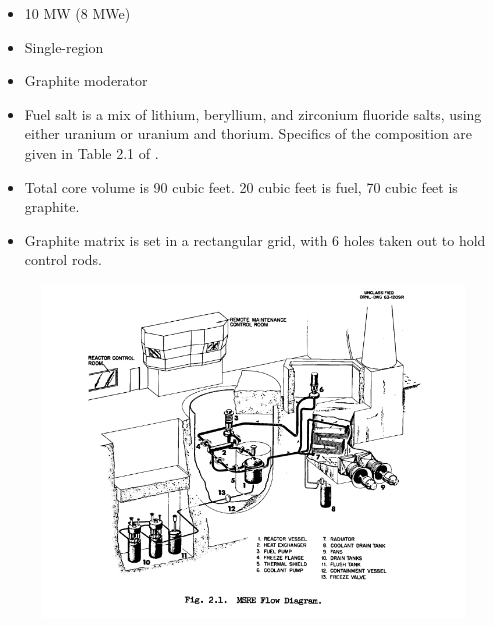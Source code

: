 \documentclass[letterpaper]{article}
\begin{document}
\begin{itemize}
\item 10 MW (8 MWe)
\item Single-region
\item Graphite moderator
\item Fuel salt is a mix of lithium, beryllium, and zirconium fluoride salts, using either uranium or uranium and thorium.  Specifics of the composition are given in Table 2.1 of \cite{robertson_msre_1965}.
\item Total core volume is 90 cubic feet.  20 cubic feet is fuel, 70 cubic feet is graphite.
\item Graphite matrix is set in a rectangular grid, with 6 holes taken out to hold control rods.
\end{itemize}

\begin{figure}[H]
  \centering
  \includegraphics[width=1.0\linewidth]{figures/MSREsource1.png}
  \label{fig:fig1}
\end{figure}
\end{document}
